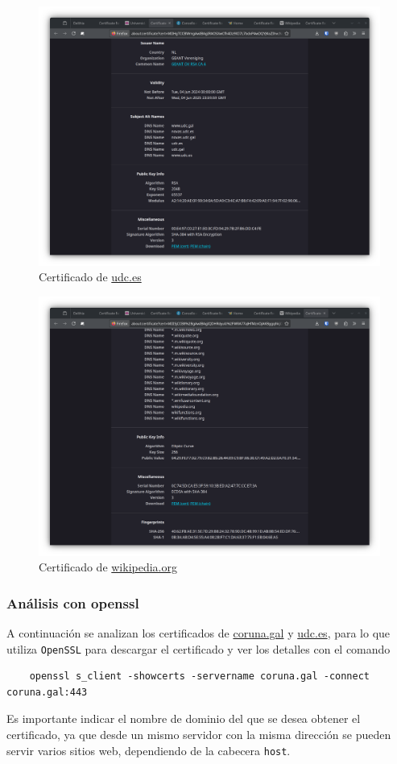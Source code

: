 \begin{figure}[H]
    \includegraphics[width=\textwidth]{cert-udc.png}
    \caption{Certificado de \url{udc.es}}
\end{figure}

\begin{figure}[H]
    \includegraphics[width=\textwidth]{cert-wikipedia.png}
    \caption{Certificado de \url{wikipedia.org}}
\end{figure}

\subsubsection{Análisis con openssl}

A continuación se analizan los certificados de \url{coruna.gal} y \url{udc.es}, para lo que utiliza \texttt{OpenSSL} para descargar el certificado y ver los detalles con el comando

\begin{verbatim}
    openssl s_client -showcerts -servername coruna.gal -connect coruna.gal:443
\end{verbatim}

Es importante indicar el nombre de dominio del que se desea obtener el certificado, ya que desde un mismo servidor con la misma dirección se pueden servir varios sitios web, dependiendo de la cabecera \texttt{host}.
